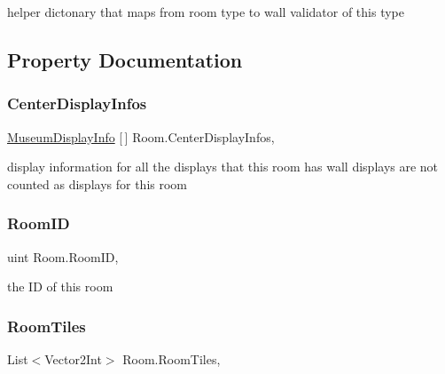 helper dictonary that maps from room type to wall validator of this type 



\subsection{Property Documentation}
\mbox{\label{class_room_ab7a1da4fa70bf843d643391bdbaa1fb5}} 
\subsubsection{\texorpdfstring{Center\+Display\+Infos}{CenterDisplayInfos}}
{\footnotesize\ttfamily \mbox{\hyperlink{class_museum_display_info}{Museum\+Display\+Info}} \mbox{[}$\,$\mbox{]} Room.\+Center\+Display\+Infos\hspace{0.3cm}{\ttfamily [get]}, {}}



display information for all the displays that this room has wall displays are not counted as displays for this room 

\mbox{\label{class_room_a499df97242b8996b66cc22737159f59c}} 
\subsubsection{\texorpdfstring{Room\+ID}{RoomID}}
{\footnotesize\ttfamily uint Room.\+Room\+ID\hspace{0.3cm}{\ttfamily [get]}, {}}



the ID of this room 

\mbox{\label{class_room_aed67349f7f161cb2214111eff3e51018}} 
\subsubsection{\texorpdfstring{Room\+Tiles}{RoomTiles}}
{\footnotesize\ttfamily List$<$Vector2\+Int$>$ Room.\+Room\+Tiles\hspace{0.3cm}{\ttfamily [get]}, {}}



